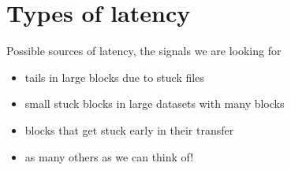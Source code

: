 \section{Types of latency}

Possible sources of latency, the signals we are looking for
\begin{itemize}
\item tails in large blocks due to stuck files
\item small stuck blocks in large datasets with many blocks
\item blocks that get stuck early in their transfer
\item as many others as we can think of!
\end{itemize}

